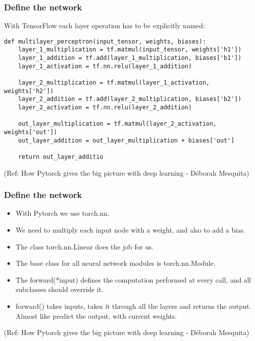\begin{frame}[fragile] \frametitle{Define the network}
 With TensorFlow each layer operation has to be explicitly named:

 \begin{lstlisting}
def multilayer_perceptron(input_tensor, weights, biases):
    layer_1_multiplication = tf.matmul(input_tensor, weights['h1'])
    layer_1_addition = tf.add(layer_1_multiplication, biases['b1'])
    layer_1_activation = tf.nn.relu(layer_1_addition)
    
    layer_2_multiplication = tf.matmul(layer_1_activation, weights['h2'])
    layer_2_addition = tf.add(layer_2_multiplication, biases['b2'])
    layer_2_activation = tf.nn.relu(layer_2_addition)
    
    out_layer_multiplication = tf.matmul(layer_2_activation, weights['out'])
    out_layer_addition = out_layer_multiplication + biases['out']
    
    return out_layer_additio
\end{lstlisting}

  {\tiny (Ref: How Pytorch gives the big picture with deep learning - Déborah Mesquita)}
\end{frame}

\begin{frame}[fragile] \frametitle{Define the network}
\begin{itemize}
\item With Pytorch we use torch.nn. 
\item We need to multiply each input node with a weight, and also to add a bias. 
\item The class torch.nn.Linear does the job for us.
\item The base class for all neural network modules is torch.nn.Module.
\item The forward(*input) defines the computation performed at every call, and all subclasses should override it.
\item forward() takes inputs, takes it through all the layers and returns the output. Almost like predict the output, with current weights.
\end{itemize}

  {\tiny (Ref: How Pytorch gives the big picture with deep learning - Déborah Mesquita)}
\end{frame}


